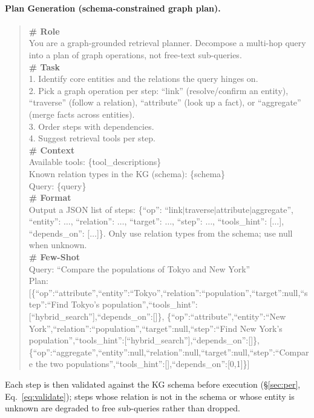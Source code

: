 \documentclass[11pt,a4paper]{article}
\begin{document}
\paragraph{Plan Generation (schema-constrained graph plan).}
\begin{quote}
\small\ttfamily
\textbf{\# Role}\\
You are a graph-grounded retrieval planner. Decompose a multi-hop query into a plan of graph operations, not free-text sub-queries.\\[4pt]
\textbf{\# Task}\\
1. Identify core entities and the relations the query hinges on.\\
2. Pick a graph operation per step: ``link'' (resolve/confirm an entity), ``traverse'' (follow a relation), ``attribute'' (look up a fact), or ``aggregate'' (merge facts across entities).\\
3. Order steps with dependencies.\\
4. Suggest retrieval tools per step.\\[4pt]
\textbf{\# Context}\\
Available tools: \{tool\_descriptions\}\\
Known relation types in the KG (schema): \{schema\}\\
Query: \{query\}\\[4pt]
\textbf{\# Format}\\
Output a JSON list of steps: \{``op'': ``link$|$traverse$|$attribute$|$aggregate'', ``entity'': $\ldots$, ``relation'': $\ldots$, ``target'': $\ldots$, ``step'': $\ldots$, ``tools\_hint'': [$\ldots$], ``depends\_on'': [$\ldots$]\}. Only use relation types from the schema; use null when unknown.\\[4pt]
\textbf{\# Few-Shot}\\
Query: ``Compare the populations of Tokyo and New York''\\
Plan: [\{``op'':``attribute'',``entity'':``Tokyo'',``relation'':``population'',``target'':null,``step'':``Find Tokyo's population'',``tools\_hint'':[``hybrid\_search''],``depends\_on'':[]\}, \{``op'':``attribute'',``entity'':``New York'',``relation'':``population'',``target'':null,``step'':``Find New York's population'',``tools\_hint'':[``hybrid\_search''],``depends\_on'':[]\}, \{``op'':``aggregate'',``entity'':null,``relation'':null,``target'':null,``step'':``Compare the two populations'',``tools\_hint'':[],``depends\_on'':[0,1]\}]
\end{quote}

Each step is then validated against the KG schema before execution (\S\ref{sec:per}, Eq.~\ref{eq:validate}); steps whose relation is not in the schema or whose entity is unknown are degraded to free sub-queries rather than dropped.
\end{document}

